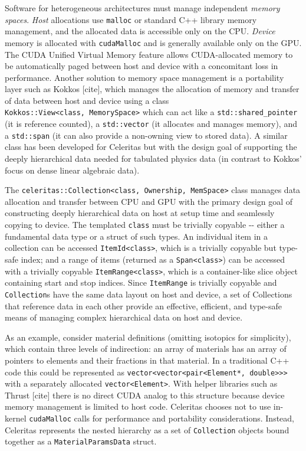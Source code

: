 Software for heterogeneous architectures must manage independent
\emph{memory spaces}. \emph{Host} allocations use \texttt{malloc} or
standard C++ library memory management, and the allocated data is
accessible only on the CPU. \emph{Device} memory is allocated with
\texttt{cudaMalloc} and is generally available only on the GPU. The CUDA
Unified Virtual Memory feature allows CUDA-allocated memory to be
automatically paged between host and device with a concomitant loss in
performance. Another solution to memory space management is a
portability layer such as Kokkos {[}cite{]}, which manages the
allocation of memory and transfer of data between host and device using
a class
\texttt{Kokkos::View\textless{}class,\ MemorySpace\textgreater{}} which
can act like a \texttt{std::shared\_pointer} (it is reference counted),
a \texttt{std::vector} (it allocates and manages memory), and a
\texttt{std::span} (it can also provide a non-owning view to stored
data). A similar class has been developed for Celeritas but with the
design goal of supporting the deeply hierarchical data needed for
tabulated physics data (in contrast to Kokkos' focus on dense linear
algebraic data).

The
\texttt{celeritas::Collection\textless{}class,\ Ownership,\ MemSpace\textgreater{}}
class manages data allocation and transfer between CPU and GPU with the
primary design goal of constructing deeply hierarchical data on host at
setup time and seamlessly copying to device. The templated
\texttt{class} must be trivially copyable -\/- either a fundamental data
type or a struct of such types. An individual item in a collection can
be accessed \texttt{ItemId\textless{}class\textgreater{}}, which is a
trivially copyable but type-safe index; and a range of items (returned
as a \texttt{Span\textless{}class\textgreater{}}) can be accessed with a
trivially copyable \texttt{ItemRange\textless{}class\textgreater{}},
which is a container-like slice object containing start and stop
indices. Since \texttt{ItemRange} is trivially copyable and
\texttt{Collection}s have the same data layout on host and device, a set
of Collections that reference data in each other provide an effective,
efficient, and type-safe means of managing complex hierarchical data on
host and device.

As an example, consider material definitions (omitting isotopics for
simplicity), which contain three levels of indirection: an array of
materials has an array of pointers to elements and their fractions in
that material. In a traditional C++ code this could be represented as
\texttt{vector\textless{}vector\textless{}pair\textless{}Element*,\ double\textgreater{}\textgreater{}\textgreater{}}
with a separately allocated
\texttt{vector\textless{}Element\textgreater{}}. With helper libraries
such as Thrust {[}cite{]} there is no direct CUDA analog to this
structure because device memory management is limited to host code.
Celeritas chooses not to use in-kernel \texttt{cudaMalloc} calls for
performance and portability considerations. Instead, Celeritas
represents the nested hierarchy as a set of \texttt{Collection} objects
bound together as a \texttt{MaterialParamsData} struct.

